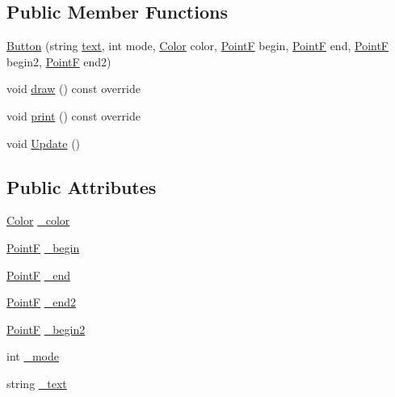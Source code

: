 \subsection*{Public Member Functions}
\begin{DoxyCompactItemize}
\item 
\hyperlink{class_button_afd9cd023462980d276d2b710d828719b}{Button} (string \hyperlink{main_8h_a96b72be91f6be2a3bcb095c810af0a0f}{text}, int mode, \hyperlink{struct_color}{Color} color, \hyperlink{drawtools_8h_adc4a66bcb59b74164130ed47cb387ec3}{PointF} begin, \hyperlink{drawtools_8h_adc4a66bcb59b74164130ed47cb387ec3}{PointF} end, \hyperlink{drawtools_8h_adc4a66bcb59b74164130ed47cb387ec3}{PointF} begin2, \hyperlink{drawtools_8h_adc4a66bcb59b74164130ed47cb387ec3}{PointF} end2)
\item 
void \hyperlink{class_button_aeb1ff67de69aef54504f36871e247edd}{draw} () const  override
\item 
void \hyperlink{class_button_a1a416884dd2bfbf3570358200bbc0ba6}{print} () const  override
\item 
void \hyperlink{class_button_a23e8bc9ad05142244ea4e79a406a6c9c}{Update} ()
\end{DoxyCompactItemize}
\subsection*{Public Attributes}
\begin{DoxyCompactItemize}
\item 
\hyperlink{struct_color}{Color} \hyperlink{class_button_ae53c83164b70983cfb4bcc62f4358a8c}{\+\_\+color}
\item 
\hyperlink{drawtools_8h_adc4a66bcb59b74164130ed47cb387ec3}{PointF} \hyperlink{class_button_a0c766187ffc7e79e2763b5238f6d2b26}{\+\_\+begin}
\item 
\hyperlink{drawtools_8h_adc4a66bcb59b74164130ed47cb387ec3}{PointF} \hyperlink{class_button_a8487f6e6aa729f90741e975f690cc0c3}{\+\_\+end}
\item 
\hyperlink{drawtools_8h_adc4a66bcb59b74164130ed47cb387ec3}{PointF} \hyperlink{class_button_af6222250ed340271757048c601f5b0a3}{\+\_\+end2}
\item 
\hyperlink{drawtools_8h_adc4a66bcb59b74164130ed47cb387ec3}{PointF} \hyperlink{class_button_aec5f5ee314d623d99afaf52f1e9beb1f}{\+\_\+begin2}
\item 
int \hyperlink{class_button_a3f66ac07842ab0b106a48bbbe15056c7}{\+\_\+mode}
\item 
string \hyperlink{class_button_a0ed4e8d42b8e0b1c0b37790aca110c5e}{\+\_\+text}
\end{DoxyCompactItemize}


